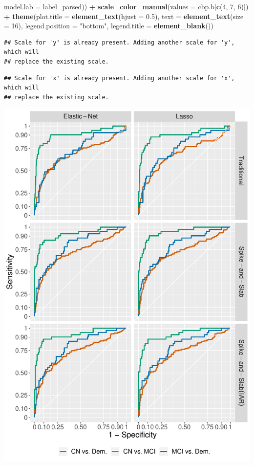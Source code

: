 \documentclass[
]{article}
\newenvironment{Shaded}{\begin{snugshade}}{\end{snugshade}}
\newcommand{\DataTypeTok}[1]{\textcolor[rgb]{0.13,0.29,0.53}{#1}}
\newcommand{\DecValTok}[1]{\textcolor[rgb]{0.00,0.00,0.81}{#1}}
\newcommand{\FloatTok}[1]{\textcolor[rgb]{0.00,0.00,0.81}{#1}}
\newcommand{\KeywordTok}[1]{\textcolor[rgb]{0.13,0.29,0.53}{\textbf{#1}}}
\newcommand{\NormalTok}[1]{#1}
\newcommand{\OperatorTok}[1]{\textcolor[rgb]{0.81,0.36,0.00}{\textbf{#1}}}
\newcommand{\StringTok}[1]{\textcolor[rgb]{0.31,0.60,0.02}{#1}}
\begin{document}
\begin{Shaded}
\begin{Highlighting}[]
                                                       \DataTypeTok{model.lab =}\NormalTok{ label_parsed)) }\OperatorTok{+}
\StringTok{  }\KeywordTok{scale_color_manual}\NormalTok{(}\DataTypeTok{values =}\NormalTok{ cbp.b[}\KeywordTok{c}\NormalTok{(}\DecValTok{4}\NormalTok{, }\DecValTok{7}\NormalTok{, }\DecValTok{6}\NormalTok{)]) }\OperatorTok{+}
\StringTok{  }\KeywordTok{theme}\NormalTok{(}\DataTypeTok{plot.title =} \KeywordTok{element_text}\NormalTok{(}\DataTypeTok{hjust =} \FloatTok{0.5}\NormalTok{), }
        \DataTypeTok{text =} \KeywordTok{element_text}\NormalTok{(}\DataTypeTok{size =} \DecValTok{16}\NormalTok{),}
        \DataTypeTok{legend.position =} \StringTok{"bottom"}\NormalTok{,}
        \DataTypeTok{legend.title =} \KeywordTok{element_blank}\NormalTok{())  }
\end{Highlighting}
\end{Shaded}

\begin{verbatim}
## Scale for 'y' is already present. Adding another scale for 'y', which will
## replace the existing scale.
\end{verbatim}

\begin{verbatim}
## Scale for 'x' is already present. Adding another scale for 'x', which will
## replace the existing scale.
\end{verbatim}

\includegraphics{analysis_details_files/figure-latex/unnamed-chunk-32-1.pdf}
\end{document}
